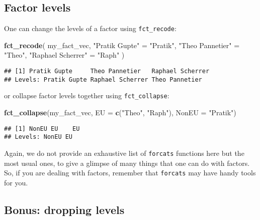 \documentclass[
]{book}
\newenvironment{Shaded}{}{}
\newcommand{\DataTypeTok}[1]{\textcolor[rgb]{0.56,0.13,0.00}{#1}}
\newcommand{\KeywordTok}[1]{\textcolor[rgb]{0.00,0.44,0.13}{\textbf{#1}}}
\newcommand{\NormalTok}[1]{#1}
\newcommand{\StringTok}[1]{\textcolor[rgb]{0.25,0.44,0.63}{#1}}
\begin{document}
\hypertarget{factor-levels}{%
\subsection{Factor levels}\label{factor-levels}}

One can change the levels of a factor using \texttt{fct\_recode}:

\begin{Shaded}
\begin{Highlighting}[]
\KeywordTok{fct_recode}\NormalTok{(}
\NormalTok{  my_fact_vec, }
  \StringTok{"Pratik Gupte"}\NormalTok{ =}\StringTok{ "Pratik"}\NormalTok{, }
  \StringTok{"Theo Pannetier"}\NormalTok{ =}\StringTok{ "Theo"}\NormalTok{, }
  \StringTok{"Raphael Scherrer"}\NormalTok{ =}\StringTok{ "Raph"}
\NormalTok{)}
\end{Highlighting}
\end{Shaded}

\begin{verbatim}
## [1] Pratik Gupte     Theo Pannetier   Raphael Scherrer
## Levels: Pratik Gupte Raphael Scherrer Theo Pannetier
\end{verbatim}

or collapse factor levels together using \texttt{fct\_collapse}:

\begin{Shaded}
\begin{Highlighting}[]
\KeywordTok{fct_collapse}\NormalTok{(my_fact_vec, }\DataTypeTok{EU =} \KeywordTok{c}\NormalTok{(}\StringTok{"Theo"}\NormalTok{, }\StringTok{"Raph"}\NormalTok{), }\DataTypeTok{NonEU =} \StringTok{"Pratik"}\NormalTok{)}
\end{Highlighting}
\end{Shaded}

\begin{verbatim}
## [1] NonEU EU    EU   
## Levels: NonEU EU
\end{verbatim}

Again, we do not provide an exhaustive list of \texttt{forcats} functions here but the most usual ones, to give a glimpse of many things that one can do with factors. So, if you are dealing with factors, remember that \texttt{forcats} may have handy tools for you.

\hypertarget{bonus-dropping-levels}{%
\subsection{Bonus: dropping levels}\label{bonus-dropping-levels}}
\end{document}
